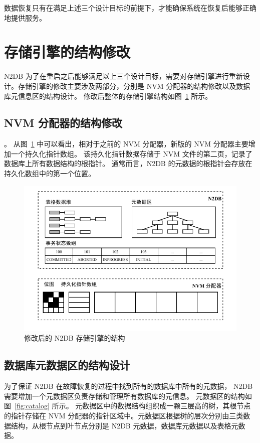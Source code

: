 数据恢复只有在满足上述三个设计目标的前提下，才能确保系统在恢复后能够正确地提供服务。

\section{存储引擎的结构修改}

N2DB 为了在重启之后能够满足以上三个设计目标，需要对存储引擎进行重新设计。存储引擎的修改主要涉及两部分，分别是 NVM 分配器的结构修改以及数据库元信息区的结构设计。
修改后整体的存储引擎结构如图~\ref{fig:nvm-allocator} 所示。

\subsection{NVM 分配器的结构修改}。
从图~\ref{fig:nvm-allocator} 中可以看出，相对于之前的 NVM 分配器，新版的 NVM 分配器主要增加一个持久化指针数组。
该持久化指针数据存储于 NVM 文件的第二页，记录了数据库上所有数据结构的根指针。
通常而言，N2DB 的元数据的根指针会存放在持久化数组中的第一个位置。

\begin{figure}[ht]
    \centering
    \includegraphics[width=1\linewidth]{figures/new-nvm-allocator}
    \caption{修改后的 N2DB 存储引擎的结构}
    \label{fig:nvm-allocator}
\end{figure}

\subsection{数据库元数据区的结构设计}

为了保证 N2DB 在故障恢复的过程中找到所有的数据库中所有的元数据， N2DB 需要增加一个元数据区负责存储和管理所有数据库的元信息。
元数据区的结构如图~\ref{fig:catalog} 所示。
元数据区中的数据结构组织成一颗三层高的树，其根节点的指针存储在 NVM 分配器的指针区域中。元数据区根据树的层次分别由三类数据结构，从根节点到叶节点分别是 N2DB 元数据，数据库元数据以及表格元数据。

